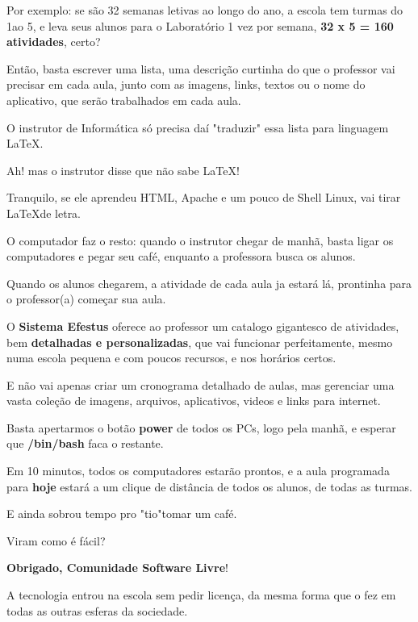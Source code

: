 \begin{multicols}{2}
Por exemplo: se são 32 semanas letivas ao longo do ano, a escola tem turmas do 1\textordmasculine ao 5\textordmasculine, e leva seus alunos para o Laboratório 1 vez por semana, \textbf{32 x 5 = 160 atividades}, certo?

Então, basta escrever uma lista, uma descrição curtinha do que o professor vai precisar em cada aula, junto com as imagens, links, textos ou o nome do aplicativo, que serão trabalhados em cada aula.

O instrutor de Informática só precisa daí "traduzir" \space essa lista para linguagem \LaTeX.

Ah! mas o instrutor disse que não sabe \LaTeX!

Tranquilo, se ele aprendeu HTML, Apache e um pouco de Shell Linux, vai tirar \LaTeX\space de letra.

O computador faz o resto: quando o instrutor chegar de manhã, basta ligar os computadores e pegar seu café, enquanto a professora busca os alunos.

Quando os alunos chegarem, a atividade de cada aula ja estará lá, prontinha para o professor(a) começar sua aula.

O \textbf{Sistema Efestus} oferece ao professor um catalogo gigantesco de atividades, bem \textbf{detalhadas e personalizadas}, que vai funcionar perfeitamente, mesmo numa escola pequena e com poucos recursos, e nos horários certos.

E não vai apenas criar um cronograma detalhado de aulas, mas gerenciar uma vasta coleção de imagens, arquivos, aplicativos, videos e links para internet.

Basta apertarmos o botão \textbf{power} de todos os PCs, logo pela manhã, e esperar que \textbf{/bin/bash} faca o restante.

Em 10 minutos, todos os computadores estarão prontos, e a aula programada para \textbf{hoje} estará a um clique de distância de todos os alunos, de todas as turmas.

E ainda sobrou tempo pro "tio"\space tomar um café.

Viram como é fácil?

\vfill\null
\columnbreak

\textbf{Obrigado, Comunidade Software Livre}!

A tecnologia entrou na escola sem pedir licença, da mesma forma que o fez em todas as outras esferas da sociedade.


\end{multicols}
